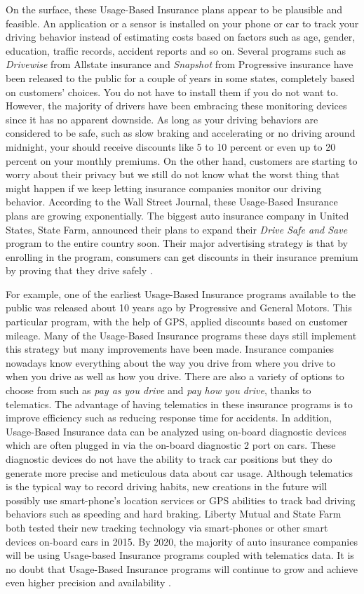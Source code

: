 On the surface, these Usage-Based Insurance plans appear to be plausible and feasible. An application or a sensor is installed on your phone or car to track your driving behavior instead of estimating costs based on factors such as age, gender, education, traffic records, accident reports and so on. Several programs such as {\em Drivewise} from Allstate insurance and {\em Snapshot} from Progressive insurance have been released to the public for a couple of years in some states, completely based on customers' choices. You do not have to install them if you do not want to. However, the majority of drivers have been embracing these monitoring devices since it has no apparent downside. As long as your driving behaviors are considered to be safe, such as slow braking and accelerating or no driving around midnight, your should receive discounts like 5 to 10 percent or even up to 20 percent on your monthly premiums. On the other hand, customers are starting to worry about their privacy but we still do not know what the worst thing that might happen if we keep letting insurance companies monitor our driving behavior. According to the Wall Street Journal, these Usage-Based Insurance plans are growing exponentially. The biggest auto insurance company in United States, State Farm, announced their plans to expand their {\em Drive Safe and Save} program to the entire country soon. Their major advertising strategy is that by enrolling in the program, consumers can get discounts in their insurance premium by proving that they drive safely \cite{Tuttle2013habits}.

For example, one of the earliest Usage-Based Insurance programs available to the public was released about 10 years ago by Progressive and General Motors. This particular program, with the help of GPS, applied discounts based on customer mileage. Many of the Usage-Based Insurance programs these days still implement this strategy but many improvements have been made. Insurance companies nowadays know everything about the way you drive from where you drive to when you drive as well as how you drive. There are also a variety of options to choose from such as {\em pay as you drive} and {\em pay how you drive}, thanks to telematics. The advantage of having telematics in these insurance programs is to improve efficiency such as reducing response time for accidents. In addition, Usage-Based Insurance data can be analyzed using on-board diagnostic devices which are often plugged in via the on-board diagnostic 2 port on cars. These diagnostic devices do not have the ability to track car positions but they do generate more precise and meticulous data about car usage. Although telematics is the typical way to record driving habits, new creations in the future will possibly use smart-phone's location services or GPS abilities to track bad driving behaviors such as speeding and hard braking. Liberty Mutual and State Farm both tested their new tracking technology via smart-phones or other smart devices on-board cars in 2015. By 2020, the majority of auto insurance companies will be using Usage-based Insurance programs coupled with telematics data. It is no doubt that Usage-Based Insurance programs will continue to grow and achieve even higher precision and availability \cite{Firm2016insurance}.

